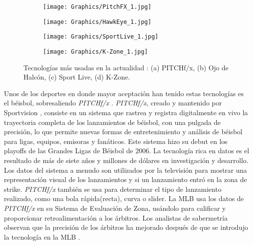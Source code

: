 \begin{figure}[h!]
	\centering
	\begin{subfigure}[b]{0.49\linewidth}
        \centering
		\texttt{[image: Graphics/PitchFX\_1.jpg]}
		\caption{}
	\end{subfigure}
	\begin{subfigure}[b]{0.49\linewidth}
        \centering
		\texttt{[image: Graphics/HawkEye\_1.jpg]}
		\caption{}
	\end{subfigure}
    \begin{subfigure}[b]{0.49\linewidth}
        \centering
        \texttt{[image: Graphics/SportLive\_1.jpg]}
        \caption{}
    \end{subfigure}
    \begin{subfigure}[b]{0.49\linewidth}
        \centering
        \texttt{[image: Graphics/K-Zone\_1.jpg]}
        \caption{}
    \end{subfigure}
    \caption{Tecnologías más usadas en la actualidad : (a) PITCHf/x, (b) Ojo de Halcón,
            (c) Sport Live, (d) K-Zone.}
	\label{fig:technologys}
\end{figure}

Unos de los deportes en donde mayor aceptación han tenido estas tecnologías es el béisbol, sobresaliendo \textit{PITCHf/x} \cite{Pitchf/x}. \textit{PITCHf/x}, creado y mantenido por Sportvision \cite{Sportvision}, consiste en un sistema que rastrea y registra digitalmente en vivo la trayectoria completa de los lanzamientos de béisbol, con una pulgada de precisión, lo que permite nuevas formas de entretenimiento y análisis de béisbol para ligas, equipos, emisoras y fanáticos. Este sistema hizo su debut en los playoffs de las Grandes Ligas de Béisbol \cite[MLB]{MLB} de 2006. La tecnología rica en datos es el resultado de más de siete años y millones de dólares en investigación y desarrollo. Los datos del sistema a menudo son utilizados por la televisión para mostrar una representación visual de los lanzamientos y si un lanzamiento entró en la zona de strike. \textit{PITCHf/x} también se usa para determinar el tipo de lanzamiento realizado, como una bola rápida(recta), curva o slider. La MLB usa los datos de \textit{PITCHf/x} en su Sistema de Evaluación de Zona, usándolo para calificar y proporcionar retroalimentación a los árbitros. Los analistas de sabermetría observan que la precisión de los árbitros ha mejorado después de que se introdujo la tecnología en la MLB \cite{SlateSportArticles}.

